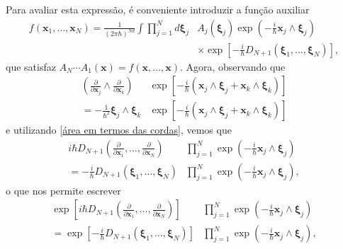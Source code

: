 \documentclass[
	12pt,
	oneside,			%
	a4paper,			%
	english,			%
	brazil				%
	]{abntex2}
\theoremstyle{definition}
\begin{document}
Para avaliar esta expressão, é conveniente introduzir a função auxiliar
\begin{equation}
    \begin{aligned}
        f(\mathbf{x}_1,\ldots,\mathbf{x}_N) = \frac{1}{\left(2 \pi \hbar\right)^{Nd}}\int \prod_{j=1}^N d \boldsymbol{\xi}_j & A_j \left(\boldsymbol{\xi}_j\right) \exp\left(-\frac{i}{\hbar} \mathbf{x}_j\wedge\boldsymbol{\xi}_j\right) \\ &\times \exp\left[-\frac{i}{\hbar}D_{N+1}\left(\boldsymbol{\xi}_1,\ldots,\boldsymbol{\xi}_N\right)\right],
    \end{aligned}
\end{equation}
que satisfaz $A_N \cdots A_1 \left(\mathbf{x}\right) = f(\mathbf{x},\ldots,\mathbf{x})$. Agora, observando que
\begin{equation}
    \begin{aligned}
        \left(\frac{\partial}{\partial \mathbf{x}_j} \wedge \frac{\partial}{\partial \mathbf{x}_k}\right) &\exp\left[-\frac{i}{\hbar} \left(\mathbf{x}_j\wedge\boldsymbol{\xi}_j + \mathbf{x}_k\wedge\boldsymbol{\xi}_k\right)\right] \\ =  -\frac{1}{\hbar^2} \boldsymbol{\xi}_j \wedge \boldsymbol{\xi}_k &\exp\left[-\frac{i}{\hbar} \left(\mathbf{x}_j\wedge\boldsymbol{\xi}_j + \mathbf{x}_k\wedge\boldsymbol{\xi}_k\right)\right]
    \end{aligned}
\end{equation}
e utilizando \eqref{área em termos das cordas}, vemos que
\begin{equation}
    \begin{aligned}
        i \hbar D_{N+1}\left(\frac{\partial}{\partial \mathbf{x}_1},\ldots,\frac{\partial}{\partial \mathbf{x}_N}\right) &\prod_{j=1}^N  \exp\left(-\frac{i}{\hbar} \mathbf{x}_j\wedge\boldsymbol{\xi}_j\right) \\ 
        =-\frac{i}{\hbar}D_{N+1}\left(\boldsymbol{\xi}_1,\ldots,\boldsymbol{\xi}_N\right) &\prod_{j=1}^N  \exp\left(-\frac{i}{\hbar} \mathbf{x}_j\wedge\boldsymbol{\xi}_j\right),
    \end{aligned}
\end{equation}
o que nos permite escrever
\begin{equation}
    \begin{aligned}
        \exp \left[i \hbar D_{N+1}\left(\frac{\partial}{\partial \mathbf{x}_1},\ldots,\frac{\partial}{\partial \mathbf{x}_N}\right)\right] &\prod_{j=1}^N  \exp\left(-\frac{i}{\hbar} \mathbf{x}_j\wedge\boldsymbol{\xi}_j\right) \\ 
        =\exp\left[-\frac{i}{\hbar}D_{N+1}\left(\boldsymbol{\xi}_1,\ldots,\boldsymbol{\xi}_N\right)\right] &\prod_{j=1}^N  \exp\left(-\frac{i}{\hbar} \mathbf{x}_j\wedge\boldsymbol{\xi}_j\right),
    \end{aligned}
\end{equation}
\end{document}
